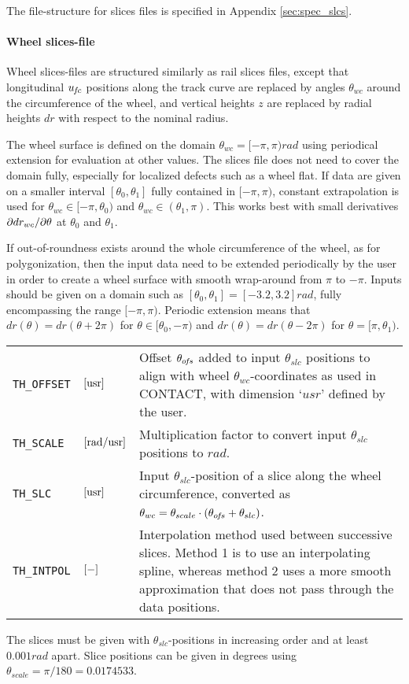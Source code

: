 \documentclass[12pt]{report}
\newenvironment{inputvars}{\vspace{0.4\baselineskip}%

\begin{tabular}{>{\raggedright}p{22mm}p{19mm}p{113mm}}}{
\end{tabular}

}
\newcommand{\inpvar}[3]{{\small\tt #1} & $#2$ & #3 \\[1ex]}
\begin{document}
The file-structure for slices files is specified in Appendix
\ref{sec:spec_slcs}.

\paragraph{Wheel slices-file}

Wheel slices-files are structured similarly as rail slices files, except
that longitudinal $u_{\mkern-2muf\mkern-2muc}$ positions along the track curve are replaced
by angles $\theta_{wc}$ around the circumference of the wheel, and
vertical heights $z$ are replaced by radial heights $dr$ with respect to
the nominal radius.

The wheel surface is defined on the domain $\theta_{wc}=[-\pi,\pi)
\unit{rad}$ using periodical extension for evaluation at other values. The
slices file does not need to cover the domain fully, especially for
localized defects such as a wheel flat.  If data are given on a smaller
interval $[\theta_0, \theta_1]$ fully contained in $[-\pi,\pi)$, constant
extrapolation is used for $\theta_{wc}\in [-\pi,\theta_0)$ and
$\theta_{wc}\in(\theta_1,\pi)$. This works best with small derivatives
$\partial dr_{wc}/\partial \theta$ at $\theta_0$ and $\theta_1$. 

If out-of-roundness exists around the whole circumference of the wheel,
as for polygonization, then the input data need to be extended periodically
by the user in order to create a wheel surface with smooth wrap-around
from $\pi$ to $-\pi$. Inputs should be given on a domain such as
$[\theta_0,\theta_1]=[-3.2,3.2] \unit{rad}$, fully encompassing the range
$[-\pi,\pi)$. Periodic extension means that $dr(\theta)=dr(\theta+2\pi)$ for
$\theta\in[\theta_0,-\pi)$ and $dr(\theta)=dr(\theta-2\pi)$ for
$\theta=[\pi,\theta_1)$.

\begin{inputvars}
\inpvar{TH\_OFFSET}{\bunit{usr}}{Offset $\theta_{o\mkern-2muf\mkern-2mus}$ added to input 
        $\theta_{slc}$ positions to align with wheel 
        $\theta_{wc}$-coordinates as used in CONTACT, with dimension
        `$\unit{usr}$' defined by the user.}
\inpvar{TH\_SCALE}{\bunit{rad/usr}}{Multiplication factor to convert input
        $\theta_{slc}$ positions to $\unit{rad}$.}
\inpvar{TH\_SLC}{\bunit{usr}}{Input $\theta_{slc}$-position of a slice along
        the wheel circumference, converted as $\theta_{wc} = \theta_{scale}
        \cdot (\theta_{o\mkern-2muf\mkern-2mus} + \theta_{slc})$.}
\inpvar{TH\_INTPOL}{\bunit{-}}{Interpolation method used between successive
        slices. Method 1 is to use an interpolating spline, whereas method
        2 uses a more smooth approximation that does not pass through the
        data positions.}
\end{inputvars}
The slices must be given with $\theta_{slc}$-positions in increasing order
and at least $0.001\unit{rad}$ apart. Slice positions can be given in
degrees using $\theta_{scale}=\pi/180= 0.0174533$. 
\end{document}
